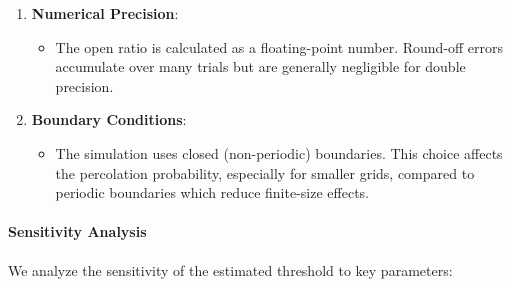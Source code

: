 \documentclass[11pt]{article}
\providecommand{\tightlist}{%
      \setlength{\itemsep}{0pt}\setlength{\parskip}{0pt}}
\begin{document}
\begin{enumerate}
  \begin{itemize}
  \tightlist
  \item
    The Union-Find with path compression has near-constant but not
    exactly \(O(1)\) time complexity. For extremely large \(n\), the
    inverse Ackermann function becomes non-negligible.
  \item
    The virtual node method assumes percolation is defined solely by
    top-bottom connectivity, which is standard but may differ from other
    definitions (e.g., left-right or wrapping boundaries).
  \end{itemize}
\item
  \textbf{Numerical Precision}:

  \begin{itemize}
  \tightlist
  \item
    The open ratio is calculated as a floating-point number. Round-off
    errors accumulate over many trials but are generally negligible for
    double precision.
  \end{itemize}
\item
  \textbf{Boundary Conditions}:

  \begin{itemize}
  \tightlist
  \item
    The simulation uses closed (non-periodic) boundaries. This choice
    affects the percolation probability, especially for smaller grids,
    compared to periodic boundaries which reduce finite-size effects.
  \end{itemize}
\end{enumerate}

\paragraph{Sensitivity Analysis}\label{sensitivity-analysis}

We analyze the sensitivity of the estimated threshold to key parameters:
\end{document}
